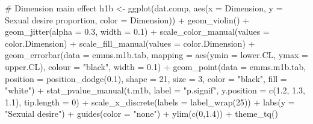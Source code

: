 \documentclass[
  bookmarksnumbered]{article}
\newenvironment{Shaded}{\begin{snugshade}}{\end{snugshade}}
\newcommand{\AttributeTok}[1]{\textcolor[rgb]{0.80,0.80,0.80}{#1}}
\newcommand{\CommentTok}[1]{\textcolor[rgb]{0.50,0.62,0.50}{#1}}
\newcommand{\DecValTok}[1]{\textcolor[rgb]{0.86,0.86,0.80}{#1}}
\newcommand{\FloatTok}[1]{\textcolor[rgb]{0.75,0.75,0.82}{#1}}
\newcommand{\FunctionTok}[1]{\textcolor[rgb]{0.94,0.94,0.56}{#1}}
\newcommand{\NormalTok}[1]{\textcolor[rgb]{0.80,0.80,0.80}{#1}}
\newcommand{\OtherTok}[1]{\textcolor[rgb]{0.94,0.94,0.56}{#1}}
\newcommand{\SpecialCharTok}[1]{\textcolor[rgb]{0.86,0.64,0.64}{#1}}
\newcommand{\StringTok}[1]{\textcolor[rgb]{0.80,0.58,0.58}{#1}}
\begin{document}
\begin{Shaded}
\begin{Highlighting}[]
\CommentTok{\# Dimension main effect}
\NormalTok{h1b }\OtherTok{\textless{}{-}} \FunctionTok{ggplot}\NormalTok{(dat.comp, }\FunctionTok{aes}\NormalTok{(}\AttributeTok{x =}\NormalTok{ Dimension, }\AttributeTok{y =} \StringTok{\textasciigrave{}}\AttributeTok{Sexual desire proportion}\StringTok{\textasciigrave{}}\NormalTok{, }\AttributeTok{color =}\NormalTok{ Dimension)) }\SpecialCharTok{+}
  \FunctionTok{geom\_violin}\NormalTok{() }\SpecialCharTok{+}
  \FunctionTok{geom\_jitter}\NormalTok{(}\AttributeTok{alpha =} \FloatTok{0.3}\NormalTok{, }\AttributeTok{width =} \FloatTok{0.1}\NormalTok{) }\SpecialCharTok{+}
  \FunctionTok{scale\_color\_manual}\NormalTok{(}\AttributeTok{values =}\NormalTok{ color.Dimension) }\SpecialCharTok{+}
  \FunctionTok{scale\_fill\_manual}\NormalTok{(}\AttributeTok{values =}\NormalTok{ color.Dimension) }\SpecialCharTok{+}
  \FunctionTok{geom\_errorbar}\NormalTok{(}\AttributeTok{data =}\NormalTok{ emms.m1b.tab, }
                \AttributeTok{mapping =} \FunctionTok{aes}\NormalTok{(}\AttributeTok{ymin =}\NormalTok{ lower.CL, }\AttributeTok{ymax =}\NormalTok{ upper.CL), }
                \AttributeTok{colour =} \StringTok{"black"}\NormalTok{, }\AttributeTok{width =} \FloatTok{0.1}\NormalTok{) }\SpecialCharTok{+}
  \FunctionTok{geom\_point}\NormalTok{(}\AttributeTok{data =}\NormalTok{ emms.m1b.tab, }
             \AttributeTok{position =} \FunctionTok{position\_dodge}\NormalTok{(}\FloatTok{0.1}\NormalTok{), }
             \AttributeTok{shape =} \DecValTok{21}\NormalTok{, }\AttributeTok{size =} \DecValTok{3}\NormalTok{,}
             \AttributeTok{color =} \StringTok{"black"}\NormalTok{, }\AttributeTok{fill =} \StringTok{"white"}\NormalTok{) }\SpecialCharTok{+}
  \FunctionTok{stat\_pvalue\_manual}\NormalTok{(t.m1b, }
                     \AttributeTok{label =} \StringTok{"p.signif"}\NormalTok{, }
                     \AttributeTok{y.position =} \FunctionTok{c}\NormalTok{(}\FloatTok{1.2}\NormalTok{, }\FloatTok{1.3}\NormalTok{, }\FloatTok{1.1}\NormalTok{), }
                     \AttributeTok{tip.length =} \DecValTok{0}\NormalTok{) }\SpecialCharTok{+}
  \FunctionTok{scale\_x\_discrete}\NormalTok{(}\AttributeTok{labels =} \FunctionTok{label\_wrap}\NormalTok{(}\DecValTok{25}\NormalTok{)) }\SpecialCharTok{+}
  \FunctionTok{labs}\NormalTok{(}\AttributeTok{y =} \StringTok{"Sexuial desire"}\NormalTok{) }\SpecialCharTok{+}
  \FunctionTok{guides}\NormalTok{(}\AttributeTok{color =} \StringTok{"none"}\NormalTok{) }\SpecialCharTok{+}
  \FunctionTok{ylim}\NormalTok{(}\FunctionTok{c}\NormalTok{(}\DecValTok{0}\NormalTok{,}\FloatTok{1.4}\NormalTok{)) }\SpecialCharTok{+}
  \FunctionTok{theme\_tq}\NormalTok{()}


\end{Highlighting}
\end{Shaded}
\end{document}
